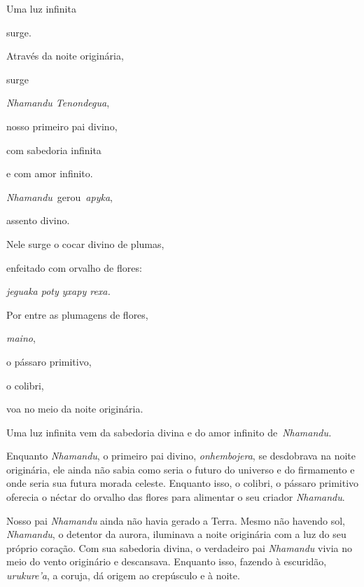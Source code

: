 

Uma luz infinita

surge.

Através da noite originária,

surge

\emph{Nhamandu Tenondegua},

nosso primeiro pai divino,

com sabedoria infinita

e com amor infinito.

 

\emph{Nhamandu}~gerou~\emph{apyka},

assento divino.

Nele surge o cocar divino de plumas,

enfeitado com orvalho de flores:

\emph{jeguaka poty yxapy rexa.}

 

Por entre as plumagens de flores,

\emph{maino},

o pássaro primitivo,

o colibri,

voa no meio da noite originária.

 

Uma luz infinita vem da sabedoria divina e do amor infinito
de~\emph{Nhamandu.}

 

\asterisc{}


 

Enquanto \emph{Nhamandu}, o primeiro pai divino, \emph{onhembojera}, se
desdobrava na noite originária, ele ainda não sabia como seria o futuro
do universo e do firmamento e onde seria sua futura morada celeste.
Enquanto isso, o colibri, o pássaro primitivo oferecia o néctar do
orvalho das flores para alimentar o seu criador \emph{Nhamandu}.

Nosso pai \emph{Nhamandu} ainda não havia gerado a Terra. Mesmo não
havendo sol, \emph{Nhamandu}, o detentor da aurora, iluminava a noite
originária com a luz do seu próprio coração. Com sua sabedoria divina, o
verdadeiro pai \emph{Nhamandu} vivia no meio do vento originário e
descansava. Enquanto isso, fazendo à escuridão, \emph{urukure'a}, a
coruja, dá origem ao crepúsculo e à noite.

